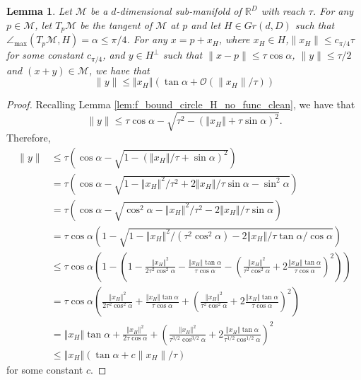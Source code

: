 \documentclass[12pt]{article}
\newtheorem{Lemma}[Theorem]{Lemma}
\theoremstyle{remark}
\newcommand{\RR}{\mathbb{R}}
\newcommand{\MM}{\mathcal{M}}
\newcommand{\OO}{\mathcal{O}}
\newcommand{\norm}[1]{\left\Vert #1 \right\Vert}
\newcommand{\maxangle}{\angle_{\max}}
\begin{document}
\begin{appendices}
\begin{Lemma}\label{lem:f_bound_circle_H_no_func_ver2_clean}
    Let $\MM$ be a $d$-dimensional sub-manifold of $\RR^D$ with reach $\tau$. For any $p \in \MM$, let $T_{p}\MM$ be the tangent of $\MM$ at $p$ and let $ H\in Gr(d, D) $ such that $ \maxangle(T_p\MM, H) = \alpha  \leq \pi/4$.
    For any $x = p + x_H$, where $x_H\in H$,$\|x_H\|\leq c_{\pi/4}\tau$ for some constant $c_{\pi/4}$, and $y\in H^\perp$  such that $\|x-p\|\leq \tau \cos \alpha$, $\|y\| \leq \tau/2$ and $(x + y)\in \MM$, we have that 
	\[
	\|y\| \leq \norm{x_H}(\tan \alpha  +\OO(\|x_H\|/\tau))
	\]
\end{Lemma}
\begin{proof}
 Recalling Lemma \ref{lem:f_bound_circle_H_no_func_clean}, we have that 
	\begin{equation}
	\|y\| \leq \tau \cos \alpha - \sqrt{\tau^2-(\norm{x_H}+\tau \sin \alpha)^2}
	.\end{equation}
	Therefore,
	\begin{align*}
	\|y\| &\leq \tau (\cos \alpha - \sqrt{1-(\norm{x_H}/\tau + \sin \alpha)^2})\\
	      &=  \tau (\cos \alpha - \sqrt{1-\norm{x_H}^2/\tau^2  + 2\norm{x_H}/\tau\sin \alpha - \sin^2\alpha})\\
	      &=  \tau (\cos \alpha - \sqrt{\cos^2\alpha-\norm{x_H}^2/\tau^2 - 2\norm{x_H}/\tau\sin \alpha })\\
	      &=  \tau \cos \alpha(1 - \sqrt{1-\norm{x_H}^2/(\tau^2\cos^2\alpha)  - 2\norm{x_H}/\tau\tan \alpha / \cos\alpha })\\
	      &\leq  \tau \cos \alpha (1 - (1-\frac{\norm{x_H}^2}{2\tau^2\cos^2\alpha}  - \frac{\norm{x_H}\tan \alpha}{\tau \cos\alpha}  - \left(\frac{\norm{x_H}^2}{\tau^2\cos^2\alpha}  + 2\frac{\norm{x_H}\tan \alpha}{\tau\cos\alpha} \right)^2))\\
	      &= \tau   \cos\alpha(\frac{\norm{x_H}^2}{2\tau^2\cos^2\alpha}  + \frac{\norm{x_H}\tan \alpha}{\tau\cos\alpha}  + \left(\frac{\norm{x_H}^2}{\tau^2\cos^2\alpha}  + 2\frac{\norm{x_H}\tan \alpha}{\tau\cos\alpha} \right)^2)\\
	      &= \norm{x_H}\tan \alpha  +\frac{\norm{x_H}^2}{2\tau\cos\alpha}  +  \left(\frac{\norm{x_H}^2}{\tau^{3/2}\cos^{3/2}\alpha}  + 2\frac{\norm{x_H}\tan \alpha}{\tau^{1/2}\cos^{1/2}\alpha} \right)^2\\
	      &\leq \norm{x_H} (\tan \alpha + c\|x_H\|/\tau)
	\end{align*}
	for some constant $c$.
\end{proof}


\end{appendices}
\end{document}

